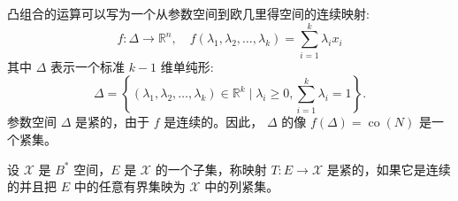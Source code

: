 \documentclass[lang=cn,newtx,10pt,scheme=chinese,thmcnt=chapter]{elegantbook}
\begin{document}
\begin{note}
凸组合的运算可以写为一个从参数空间到欧几里得空间的连续映射:
\begin{equation*}
f: \Delta \rightarrow \mathbb{R} ^n, \quad f\left(\lambda_1, \lambda_2, \ldots, \lambda_k\right)=\sum_{i=1}^k \lambda_i x_i
\end{equation*}
其中 $\Delta$ 表示一个标准 $k-1$ 维单纯形:
\begin{equation*}
\Delta=\left\{\left(\lambda_1, \lambda_2, \ldots, \lambda_k\right) \in \mathbb{R} ^k \mid \lambda_i \geq 0, \sum_{i=1}^k \lambda_i=1\right\} .
\end{equation*}
参数空间 $\Delta$ 是紧的，由于 $f$ 是连续的。因此， $\Delta$ 的像 $f(\Delta)=\operatorname{co}(N)$ 是一个紧集。
\end{note}
\begin{definition}
设 \(\mathscr{X}\) 是 \(B^*\) 空间，\(E\) 是 \(\mathscr{X}\) 的一个子集，称映射 \(T: E \rightarrow \mathscr{X}\) 是紧的，如果它是连续的并且把 \(E\) 中的任意有界集映为 \(\mathscr{X}\) 中的列紧集。
\end{definition}
\end{document}
